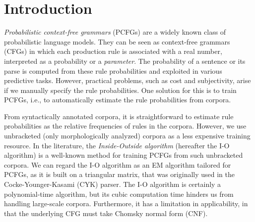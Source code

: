 \documentclass[english]{jnlp_1.4_rep}
\begin{document}
\maketitle

\section{Introduction}

{\em Probabilistic context-free grammars} (PCFGs) are a widely known class
of probabilistic language models.  They can be seen as context-free
grammars (CFGs) in which each production rule is associated with
a real number, interpreted as a probability or a {\em parameter}.
The probability of a sentence or its parse is computed from these
rule probabilities
and exploited in various predictive tasks.  However, practical problems,
such as cost and subjectivity, arise if we manually specify the
rule probabilities.  One solution for this is to train PCFGs,
i.e., to automatically estimate the rule probabilities from corpora.

From syntactically annotated corpora, it is straightforward
to estimate rule probabilities as the relative frequencies of rules
in the corpora.  However, we use unbracketed (only morphologically analyzed)
corpora as a less expensive training resource.
In the literature, the {\em Inside-Outside algorithm}
(hereafter the I-O algorithm) \cite{Baker79,Lari90}
is a well-known method for training PCFGs from such unbracketed corpora.
We can regard the I-O algorithm as an EM algorithm
\cite{Dempster77} tailored for PCFGs,
as it is built on a triangular matrix, that was originally used in
the Cocke-Younger-Kasami (CYK) parser.
The I-O algorithm is certainly a polynomial-time algorithm, but
its cubic computation time hinders us from handling large-scale
corpora.  Furthermore, it has a limitation in
applicability, in that the underlying CFG must take Chomsky normal form (CNF).
\end{document}
